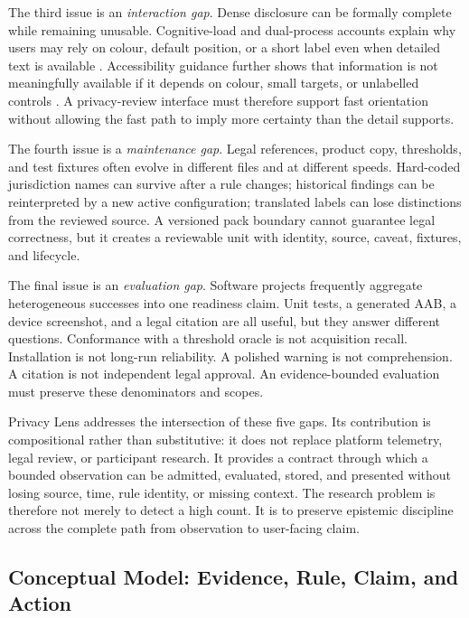 The third issue is an \emph{interaction gap}. Dense disclosure can be formally complete while remaining unusable. Cognitive-load and dual-process accounts explain why users may rely on colour, default position, or a short label even when detailed text is available \cite{27,22}. Accessibility guidance further shows that information is not meaningfully available if it depends on colour, small targets, or unlabelled controls \cite{wcag22,androidaccess}. A privacy-review interface must therefore support fast orientation without allowing the fast path to imply more certainty than the detail supports.

The fourth issue is a \emph{maintenance gap}. Legal references, product copy, thresholds, and test fixtures often evolve in different files and at different speeds. Hard-coded jurisdiction names can survive after a rule changes; historical findings can be reinterpreted by a new active configuration; translated labels can lose distinctions from the reviewed source. A versioned pack boundary cannot guarantee legal correctness, but it creates a reviewable unit with identity, source, caveat, fixtures, and lifecycle.

The final issue is an \emph{evaluation gap}. Software projects frequently aggregate heterogeneous successes into one readiness claim. Unit tests, a generated AAB, a device screenshot, and a legal citation are all useful, but they answer different questions. Conformance with a threshold oracle is not acquisition recall. Installation is not long-run reliability. A polished warning is not comprehension. A citation is not independent legal approval. An evidence-bounded evaluation must preserve these denominators and scopes.

Privacy Lens addresses the intersection of these five gaps. Its contribution is compositional rather than substitutive: it does not replace platform telemetry, legal review, or participant research. It provides a contract through which a bounded observation can be admitted, evaluated, stored, and presented without losing source, time, rule identity, or missing context. The research problem is therefore not merely to detect a high count. It is to preserve epistemic discipline across the complete path from observation to user-facing claim.

\subsection{Conceptual Model: Evidence, Rule, Claim, and Action}

